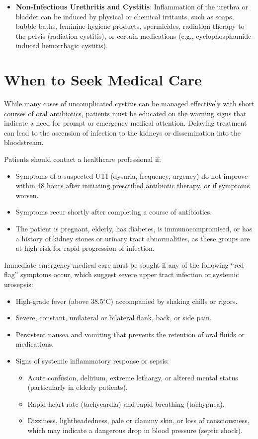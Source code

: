 \begin{itemize}
    \item \textbf{Non-Infectious Urethritis and Cystitis}: Inflammation of the urethra or bladder can be induced by physical or chemical irritants, such as soaps, bubble baths, feminine hygiene products, spermicides, radiation therapy to the pelvis (radiation cystitis), or certain medications (e.g., cyclophosphamide-induced hemorrhagic cystitis).
\end{itemize}

\section*{When to Seek Medical Care}
While many cases of uncomplicated cystitis can be managed effectively with short courses of oral antibiotics, patients must be educated on the warning signs that indicate a need for prompt or emergency medical attention. Delaying treatment can lead to the ascension of infection to the kidneys or dissemination into the bloodstream.

Patients should contact a healthcare professional if:
\begin{itemize}
    \item Symptoms of a suspected UTI (dysuria, frequency, urgency) do not improve within 48 hours after initiating prescribed antibiotic therapy, or if symptoms worsen.
    \item Symptoms recur shortly after completing a course of antibiotics.
    \item The patient is pregnant, elderly, has diabetes, is immunocompromised, or has a history of kidney stones or urinary tract abnormalities, as these groups are at high risk for rapid progression of infection.
\end{itemize}

Immediate emergency medical care must be sought if any of the following ``red flag'' symptoms occur, which suggest severe upper tract infection or systemic urosepsis:
\begin{itemize}
    \item High-grade fever (above 38.5$^\circ$C) accompanied by shaking chills or rigors.
    \item Severe, constant, unilateral or bilateral flank, back, or side pain.
    \item Persistent nausea and vomiting that prevents the retention of oral fluids or medications.
    \item Signs of systemic inflammatory response or sepsis:
    \begin{itemize}
        \item Acute confusion, delirium, extreme lethargy, or altered mental status (particularly in elderly patients).
        \item Rapid heart rate (tachycardia) and rapid breathing (tachypnea).
        \item Dizziness, lightheadedness, pale or clammy skin, or loss of consciousness, which may indicate a dangerous drop in blood pressure (septic shock).
    \end{itemize}
\end{itemize}

